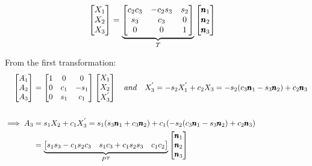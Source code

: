 \begin{align*}
    \begin{bmatrix} X_1\\ X_2\\ X_3 \end{bmatrix} &= \underbrace{\begin{bmatrix} c_2 c_3 & -c_2 s_3 & s_2\\
                                s_3     & c_3      & 0\\
                                0       & 0        & 1 \end{bmatrix}}_T
                            \begin{bmatrix} \pmb n_1 \\ \pmb n_2 \\ \pmb n_3 \end{bmatrix}
\end{align*}

From the first transformation:
\begin{align*}
    \begin{bmatrix} A_1\\ A_2\\ A_3 \end{bmatrix} &=
                    \begin{bmatrix} 1 & 0 & 0\\
                        0 & c_1 & -s_1\\
                        0 & s_1 & c_1 \end{bmatrix}
    \begin{bmatrix} X_1\\ X_2\\ X_3^{'} \end{bmatrix}
    \quad and \quad X_3^{'} = -s_2 X_1^{'} + c_2 X_3 = -s_2 (c_3 \pmb n_1 - s_3 \pmb n_2) + c_2 \pmb n_3\\
    \\
    \implies A_3 &= s_1 X_2 + c_1 X_3^{'} = s_1(s_3 \pmb n_1 + c_3 \pmb n_2 ) + c_1 (-s_2 (c_3 \pmb n_1 - s_3 \pmb n_2) + c_2 \pmb n_3)\\
    &= \underbrace{\begin{bmatrix} s_1 s_3 - c_1s_2c_3 & s_1c_3 + c_1 s_2 s_3 & c_1 c_2 \end{bmatrix}}_{P^T}
        \begin{bmatrix} \pmb n_1 \\ \pmb n_2 \\ \pmb n_3 \end{bmatrix}
\end{align*}

